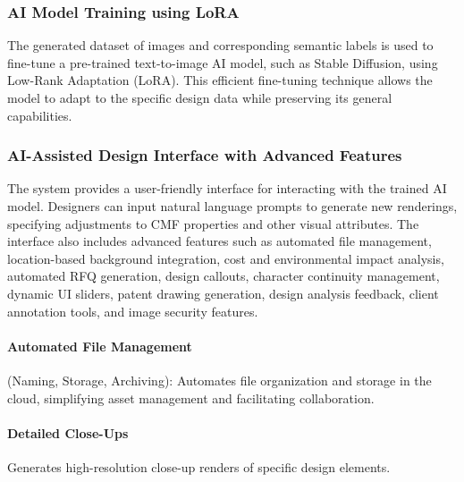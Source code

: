 \documentclass{article}
\begin{document}
\subsubsection{AI Model Training using LoRA}
The generated dataset of images and corresponding semantic labels is used to fine-tune a pre-trained text-to-image AI model, such as Stable Diffusion, using Low-Rank Adaptation (LoRA). This efficient fine-tuning technique allows the model to adapt to the specific design data while preserving its general capabilities.

\subsubsection{AI-Assisted Design Interface with Advanced Features}
The system provides a user-friendly interface for interacting with the trained AI model. Designers can input natural language prompts to generate new renderings, specifying adjustments to CMF properties and other visual attributes. The interface also includes advanced features such as automated file management, location-based background integration, cost and environmental impact analysis, automated RFQ generation, design callouts, character continuity management, dynamic UI sliders, patent drawing generation, design analysis feedback, client annotation tools, and image security features.

\paragraph{Automated File Management} (Naming, Storage, Archiving): Automates file organization and storage in the cloud, simplifying asset management and facilitating collaboration.

\paragraph{Detailed Close-Ups} Generates high-resolution close-up renders of specific design elements.
\end{document}
